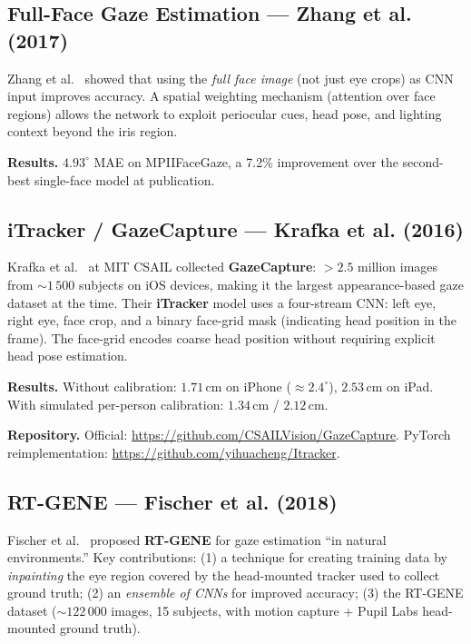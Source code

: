 \documentclass[11pt,a4paper]{article}
\begin{document}
\subsection{Full-Face Gaze Estimation --- Zhang et al. (2017)}

Zhang et al.~\cite{zhang2017written} showed that using the \textit{full face image} (not just eye crops) as CNN input improves accuracy.
A spatial weighting mechanism (attention over face regions) allows the network to exploit periocular cues, head pose, and lighting context beyond the iris region.

\textbf{Results.} $4.93^\circ$ MAE on MPIIFaceGaze, a 7.2\% improvement over the second-best single-face model at publication.

\subsection{iTracker / GazeCapture --- Krafka et al. (2016)}

Krafka et al.~\cite{krafka2016eye} at MIT CSAIL collected \textbf{GazeCapture}: $>2.5$ million images from ${\sim}1\,500$ subjects on iOS devices, making it the largest appearance-based gaze dataset at the time.
Their \textbf{iTracker} model uses a four-stream CNN: left eye, right eye, face crop, and a binary face-grid mask (indicating head position in the frame).
The face-grid encodes coarse head position without requiring explicit head pose estimation.

\textbf{Results.} Without calibration: $1.71\,\text{cm}$ on iPhone (${\approx}2.4^\circ$), $2.53\,\text{cm}$ on iPad.
With simulated per-person calibration: $1.34\,\text{cm}$ / $2.12\,\text{cm}$.

\textbf{Repository.}
Official: \url{https://github.com/CSAILVision/GazeCapture}.
PyTorch reimplementation: \url{https://github.com/yihuacheng/Itracker}.

\subsection{RT-GENE --- Fischer et al. (2018)}

Fischer et al.~\cite{fischer2018rtgene} proposed \textbf{RT-GENE} for gaze estimation ``in natural environments.''
Key contributions:
(1) a technique for creating training data by \textit{inpainting} the eye region covered by the head-mounted tracker used to collect ground truth;
(2) an \textit{ensemble of CNNs} for improved accuracy;
(3) the RT-GENE dataset (${\sim}122\,000$ images, 15 subjects, with motion capture + Pupil Labs head-mounted ground truth).
\end{document}
